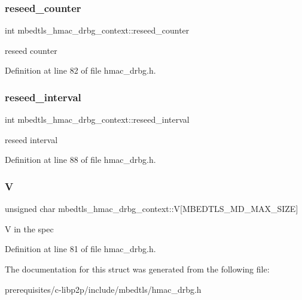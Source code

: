\subsubsection{\texorpdfstring{reseed\+\_\+counter}{reseed\_counter}}
{\footnotesize\ttfamily int mbedtls\+\_\+hmac\+\_\+drbg\+\_\+context\+::reseed\+\_\+counter}

reseed counter 

Definition at line 82 of file hmac\+\_\+drbg.\+h.

\mbox{\label{structmbedtls__hmac__drbg__context_aa69d31aabb0c213dd5f3ea38b8f3f1ad}} 
\subsubsection{\texorpdfstring{reseed\+\_\+interval}{reseed\_interval}}
{\footnotesize\ttfamily int mbedtls\+\_\+hmac\+\_\+drbg\+\_\+context\+::reseed\+\_\+interval}

reseed interval 

Definition at line 88 of file hmac\+\_\+drbg.\+h.

\mbox{\label{structmbedtls__hmac__drbg__context_a3e426c343012174c037a462535d23715}} 
\subsubsection{\texorpdfstring{V}{V}}
{\footnotesize\ttfamily unsigned char mbedtls\+\_\+hmac\+\_\+drbg\+\_\+context\+::V\mbox{[}M\+B\+E\+D\+T\+L\+S\+\_\+\+M\+D\+\_\+\+M\+A\+X\+\_\+\+S\+I\+ZE\mbox{]}}

V in the spec 

Definition at line 81 of file hmac\+\_\+drbg.\+h.



The documentation for this struct was generated from the following file\+:\begin{DoxyCompactItemize}
\item 
prerequisites/c-\/libp2p/include/mbedtls/hmac\+\_\+drbg.\+h\end{DoxyCompactItemize}

